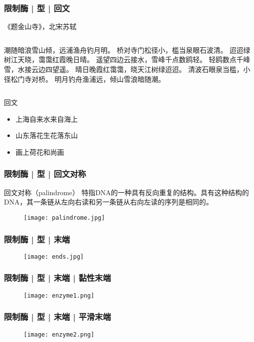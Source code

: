 \begin{frame}
  \frametitle{限制酶 | 型 | 回文}
  \begin{block}{《题金山寺》，北宋\textbullet 苏轼}
  \begin{columns}
潮随暗浪雪山倾，远浦渔舟钓月明。
桥对寺门松径小，槛当泉眼石波清。
迢迢绿树江天晓，霭霭红霞晚日晴。
遥望四边云接水，雪峰千点数鸥轻。
    \pause
轻鸥数点千峰雪，水接云边四望遥。
晴日晚霞红霭霭，晓天江树绿迢迢。
清波石眼泉当槛，小径松门寺对桥。
明月钓舟渔浦远，倾山雪浪暗随潮。
  \end{columns}
  \end{block}
  \pause
  \begin{block}{回文}
    \begin{itemize}
      \item 上海自来水来自海上
      \item 山东落花生花落东山
      \item 画上荷花和尚画
    \end{itemize}
  \end{block}
\end{frame}

\begin{frame}
  \frametitle{限制酶 | 型 | 回文对称}
  \begin{block}{回文对称（palindrome）}
    特指DNA的一种具有反向重复的结构。具有这种结构的DNA，其一条链从左向右读和另一条链从右向左读的序列是相同的。
  \end{block}
  \begin{figure}
    \centering
    \texttt{[image: palindrome.jpg]}
  \end{figure}
\end{frame}

\begin{frame}
  \frametitle{限制酶 | 型 | 末端}
  \begin{figure}
    \centering
    \texttt{[image: ends.jpg]}
  \end{figure}
\end{frame}

\begin{frame}
  \frametitle{限制酶 | 型 | 末端 | 黏性末端}
  \begin{figure}
    \centering
    \texttt{[image: enzyme1.png]}
  \end{figure}
\end{frame}

\begin{frame}
  \frametitle{限制酶 | 型 | 末端 | 平滑末端}
  \begin{figure}
    \centering
    \texttt{[image: enzyme2.png]}
  \end{figure}
\end{frame}

